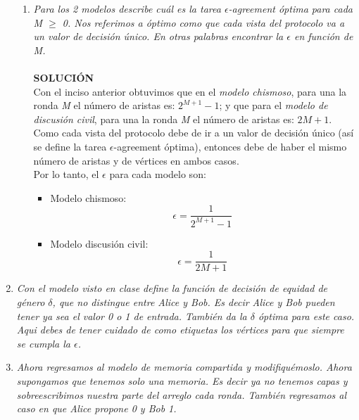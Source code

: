 \documentclass{article}
\begin{document}
\begin{enumerate}
{\begin{enumerate}
      \item{\textsl{Para los 2 modelos describe cuál es la tarea $\epsilon$-agreement
        óptima para cada \textit{M} $≥$ 0. Nos referimos a óptimo como que cada
        vista del protocolo va a un valor de decisión único. En otras palabras
        encontrar la $\epsilon$ en función de M.}}\\\\

        \textbf{SOLUCIÓN}\\
        Con el inciso anterior obtuvimos que en el \textit{modelo chismoso}, para una 
        la ronda \textit{M} el número de aristas es: $2^{M + 1}-1$; y que para el \textit{modelo
        de discusión civil}, para una la ronda \textit{M} el número de aristas es: $2M + 1$.
        Como cada vista del protocolo debe de ir a un valor de decisión único (así se define la tarea
        $\epsilon$-agreement óptima), entonces debe de haber el mismo número de aristas y de vértices
        en ambos casos.\\
        Por lo tanto, el $\epsilon$ para cada modelo son:
        \begin{itemize}
            \item {
                Modelo chismoso: \begin{equation} \epsilon = \frac{1}{2^{M + 1}-1} \end{equation}
            }
            \item {
                Modelo discusión civil: \begin{equation} \epsilon = \frac{1}{2M + 1} \end{equation}
            }
        \end{itemize}
    \end{enumerate}
  }

\item{
    \textsl{
    Con el modelo visto en clase define la función de decisión de equidad de género
    $\delta$, que no distingue entre Alice y Bob. Es decir Alice y Bob pueden tener
    ya sea el valor 0 o 1 de entrada. También da la $\delta$ óptima para este caso.
    Aqui debes de tener cuidado de como etiquetas los vértices para que siempre
    se cumpla la $\epsilon$.}
  }

\item{
    
    \textsl{
    Ahora regresamos al modelo de memoria compartida y modifiquémoslo. Ahora 
    supongamos que tenemos solo una memoria. Es decir ya no tenemos capas y
    sobreescribimos nuestra parte del arreglo cada ronda. También regresamos
    al caso en que Alice propone 0 y Bob 1.}
    \begin{enumerate}
      

\end{enumerate}}
\end{enumerate}
\end{document}
